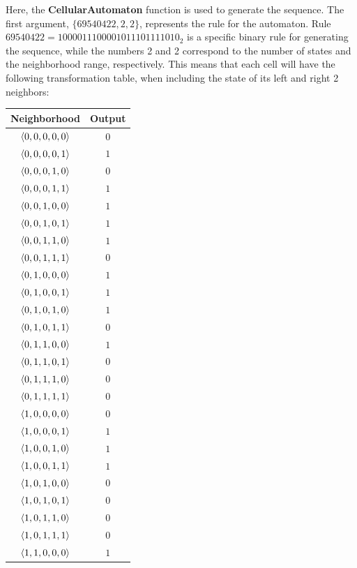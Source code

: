 \documentclass[conference]{IEEEtran}
\begin{document}
Here, the \textbf{CellularAutomaton} function is used to generate the sequence. The first argument, $\{69540422,2,2\}$, represents the rule for the automaton. Rule $69540422 = 1000011100001011101111010_2$ is a specific binary rule for generating the sequence, while the numbers 2 and 2 correspond to the number of states and the neighborhood range, respectively. This means that each cell will have the following transformation table, when including the state of its left and right 2 neighbors:

\begin{table}[h]
\centering
\begin{tabular}{|c|c|}
\hline
\textbf{Neighborhood} & \textbf{Output} \\
\hline
$\langle 0,0,0,0,0 \rangle$ & $0$ \\ \hline
$\langle 0,0,0,0,1 \rangle$ & $1$ \\ \hline
$\langle 0,0,0,1,0 \rangle$ & $0$ \\ \hline
$\langle 0,0,0,1,1 \rangle$ & $1$ \\ \hline
$\langle 0,0,1,0,0 \rangle$ & $1$ \\ \hline
$\langle 0,0,1,0,1 \rangle$ & $1$ \\ \hline
$\langle 0,0,1,1,0 \rangle$ & $1$ \\ \hline
$\langle 0,0,1,1,1 \rangle$ & $0$ \\ \hline
$\langle 0,1,0,0,0 \rangle$ & $1$ \\ \hline
$\langle 0,1,0,0,1 \rangle$ & $1$ \\ \hline
$\langle 0,1,0,1,0 \rangle$ & $1$ \\ \hline
$\langle 0,1,0,1,1 \rangle$ & $0$ \\ \hline
$\langle 0,1,1,0,0 \rangle$ & $1$ \\ \hline
$\langle 0,1,1,0,1 \rangle$ & $0$ \\ \hline
$\langle 0,1,1,1,0 \rangle$ & $0$ \\ \hline
$\langle 0,1,1,1,1 \rangle$ & $0$ \\ \hline
$\langle 1,0,0,0,0 \rangle$ & $0$ \\ \hline
$\langle 1,0,0,0,1 \rangle$ & $1$ \\ \hline
$\langle 1,0,0,1,0 \rangle$ & $1$ \\ \hline
$\langle 1,0,0,1,1 \rangle$ & $1$ \\ \hline
$\langle 1,0,1,0,0 \rangle$ & $0$ \\ \hline
$\langle 1,0,1,0,1 \rangle$ & $0$ \\ \hline
$\langle 1,0,1,1,0 \rangle$ & $0$ \\ \hline
$\langle 1,0,1,1,1 \rangle$ & $0$ \\ \hline
$\langle 1,1,0,0,0 \rangle$ & $1$ \\ \hline

\end{tabular}
\end{table}
\end{document}
